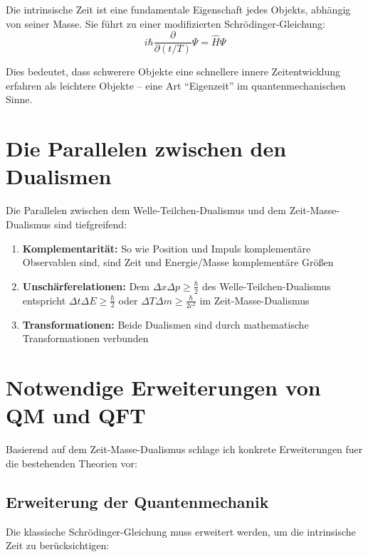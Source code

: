 \documentclass[a4paper,12pt]{article}
\begin{document}
	Die intrinsische Zeit ist eine fundamentale Eigenschaft jedes Objekts, abhängig von seiner Masse. Sie führt zu einer modifizierten Schrödinger-Gleichung:
	\begin{equation}
		i\hbar \frac{\partial}{\partial (t/T)} \Psi = \hat{H} \Psi
	\end{equation}
	
	Dies bedeutet, dass schwerere Objekte eine schnellere innere Zeitentwicklung erfahren als leichtere Objekte -- eine Art ``Eigenzeit'' im quantenmechanischen Sinne.
	
	\section{Die Parallelen zwischen den Dualismen}
	
	Die Parallelen zwischen dem Welle-Teilchen-Dualismus und dem Zeit-Masse-Dualismus sind tiefgreifend:
	
	\begin{enumerate}
		\item \textbf{Komplementarität:} So wie Position und Impuls komplementäre Observablen sind, sind Zeit und Energie/Masse komplementäre Größen
		
		\item \textbf{Unschärferelationen:} Dem $\Delta x \Delta p \geq \frac{\hbar}{2}$ des Welle-Teilchen-Dualismus entspricht $\Delta t \Delta E \geq \frac{\hbar}{2}$ oder $\Delta T \Delta m \geq \frac{\hbar}{2c^2}$ im Zeit-Masse-Dualismus
		
		\item \textbf{Transformationen:} Beide Dualismen sind durch mathematische Transformationen verbunden
	\end{enumerate}
	
	\section{Notwendige Erweiterungen von QM und QFT}
	
	Basierend auf dem Zeit-Masse-Dualismus schlage ich konkrete Erweiterungen fuer die bestehenden Theorien vor:
	
	\subsection{Erweiterung der Quantenmechanik}
	
	Die klassische Schrödinger-Gleichung muss erweitert werden, um die intrinsische Zeit zu berücksichtigen:
	
\end{document}
